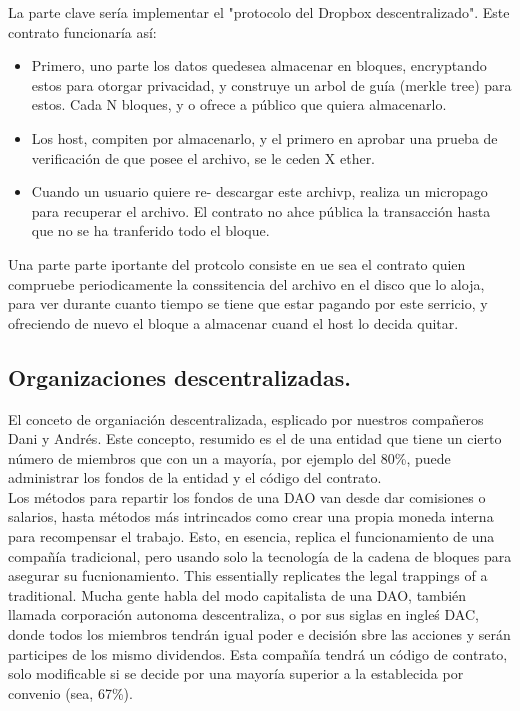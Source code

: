 \documentclass[11pt,a4paper]{article}
\begin{document}
La parte clave sería implementar el "protocolo del Dropbox descentralizado". Este contrato funcionaría así:
\begin{itemize}
	\item Primero, uno parte los datos quedesea almacenar en bloques, encryptando estos para otorgar privacidad, y construye un arbol de guía (merkle tree) para estos. Cada N bloques, y o ofrece a público que quiera almacenarlo.
	\item Los host, compiten por almacenarlo, y el primero en aprobar una prueba de verificación de que posee el archivo, se le ceden X ether.
	\item Cuando un usuario quiere re- descargar este archivp, realiza un micropago para recuperar el archivo. El contrato no ahce pública la transacción hasta que no  se ha tranferido todo el bloque.
	
\end{itemize}

Una parte parte iportante del protcolo consiste en ue sea el contrato quien compruebe periodicamente la conssitencia del archivo en el disco que lo aloja, para ver durante cuanto tiempo se tiene que estar pagando por este serricio, y ofreciendo de nuevo el bloque a almacenar cuand el host lo decida quitar.

\subsection{Organizaciones descentralizadas.}

El conceto de organiación descentralizada, esplicado por nuestros compañeros Dani y Andrés. Este concepto, resumido es el de una entidad que tiene un cierto número de miembros que con un a mayoría,  por ejemplo del 80\%, puede administrar los fondos de la entidad y el código del contrato.\\

Los métodos para repartir los fondos de una DAO van desde dar comisiones o salarios, hasta métodos más intrincados como crear una propia moneda interna para recompensar el trabajo. Esto, en esencia, replica el funcionamiento de una compañía tradicional, pero usando solo la tecnología de la cadena de bloques para asegurar su fucnionamiento. This essentially replicates the legal trappings of a traditional. Mucha gente habla del modo capitalista de una DAO, también llamada  corporación autonoma descentraliza, o por sus siglas en ingleś DAC, donde todos los miembros tendrán igual poder e decisión sbre las acciones y serán participes de los mismo dividendos. Esta compañía tendrá un código de contrato, solo modificable si se decide por una mayoría superior a la establecida por convenio (sea, 67\%).\\
\end{document}
